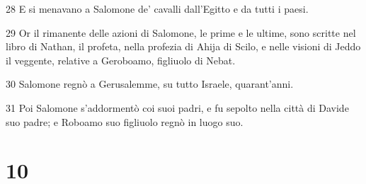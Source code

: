 \par 28 E si menavano a Salomone de' cavalli dall'Egitto e da tutti i paesi.
\par 29 Or il rimanente delle azioni di Salomone, le prime e le ultime, sono scritte nel libro di Nathan, il profeta, nella profezia di Ahija di Scilo, e nelle visioni di Jeddo il veggente, relative a Geroboamo, figliuolo di Nebat.
\par 30 Salomone regnò a Gerusalemme, su tutto Israele, quarant'anni.
\par 31 Poi Salomone s'addormentò coi suoi padri, e fu sepolto nella città di Davide suo padre; e Roboamo suo figliuolo regnò in luogo suo.

\chapter{10}

